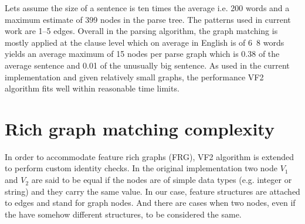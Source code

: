 Lets assume the size of a sentence is ten times the average i.e. 200 words and a maximum estimate of 399 nodes in the parse tree. The patterns used in current work are 1--5 edges. Overall in the parsing algorithm, the graph matching is mostly applied at the clause level which on average in English is of 6~8 words yields an average maximum of 15 nodes per parse graph which is 0.38 of the average sentence and 0.01 of the unusually big sentence.
As used in the current implementation and given relatively small graphs, the performance VF2 algorithm fits well within reasonable time limits.


\section{Rich graph matching complexity}
\label{sec:rich-graph-matching}
In order to accommodate feature rich graphs (FRG), VF2 algorithm is extended to perform custom identity checks. In the original implementation two node $V_{1}$ and $V_{2}$ are said to be equal if the nodes are of simple data types (e.g. integer or string) and they carry the same value. In our case, feature structures are attached to edges and stand for graph nodes. And there are cases when two nodes, even if the have somehow different structures, to be considered the same. 


%




